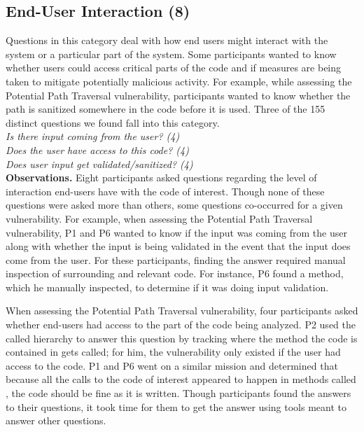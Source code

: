 \documentclass[conference]{IEEEtran}
\begin{document}

\noindent\subsection{\textbf{End-User Interaction (8)}}
\label{eui}


Questions in this category deal with how end users might interact with the system or a particular part of the system. 
Some participants wanted to know whether users could access critical parts of the code and if measures are being taken to mitigate potentially malicious activity. 
For example, while assessing the Potential Path Traversal vulnerability, participants wanted to know whether the path is sanitized somewhere in the code before it is used.
Three of the 155 distinct questions we found fall into this category.
\\

\noindent\emph{Is there input coming from the user? (4)} \\
\emph{Does the user have access to this code? (4)} \\
\emph{Does user input get validated/sanitized? (4)} \\


\noindent\textbf{Observations.}
Eight participants asked questions regarding the level of interaction end-users have with the code of interest. 
Though none of these questions were asked more than others, some questions co-occurred for a given vulnerability.
For example, when assessing the Potential Path Traversal vulnerability, P1 and P6 wanted to know if the input was coming from the user along with whether the input is being validated in the event that the input does come from the user.
For these participants, finding the answer required manual inspection of surrounding and relevant code. 
For instance, P6 found a  method, which he manually inspected, to determine if it was doing input validation.

When assessing the Potential Path Traversal vulnerability, four participants asked whether end-users had access to the part of the code being analyzed.
P2 used the called hierarchy to answer this question by tracking where the method the code is contained in gets called; for him, the vulnerability only existed if the user had access to the code.
P1 and P6 went on a similar mission and determined that because all the calls to the code of interest appeared to happen in methods called , the code should be fine as it is written.
Though participants found the answers to their questions, it took time for them to get the answer using tools meant to answer other questions.
\\
\end{document}
